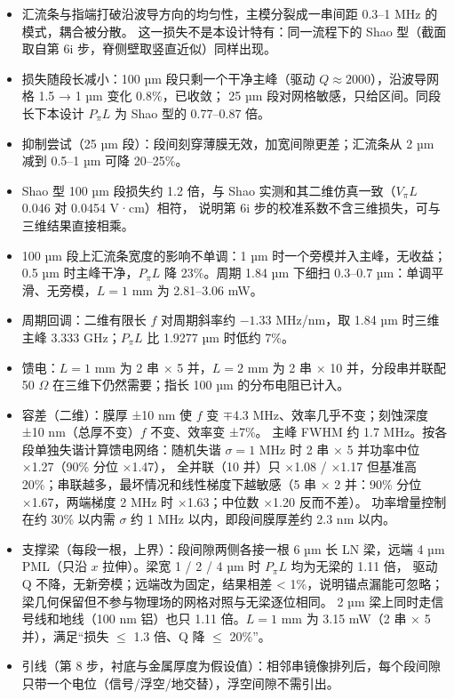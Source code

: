 \documentclass[10pt,a4paper]{article}
\begin{document}
\begin{itemize}
  \item 汇流条与指端打破沿波导方向的均匀性，主模分裂成一串间距 0.3--1 MHz 的模式，耦合被分散。
        这一损失不是本设计特有：同一流程下的 Shao 型（截面取自第 6i 步，脊侧壁取竖直近似）同样出现。
  \item 损失随段长减小：100 µm 段只剩一个干净主峰（驱动 $Q\approx2000$），沿波导网格 1.5 → 1 µm 变化 0.8\%，已收敛；
        25 µm 段对网格敏感，只给区间。同段长下本设计 $P_\pi L$ 为 Shao 型的 0.77--0.87 倍。
  \item 抑制尝试（25 µm 段）：段间刻穿薄膜无效，加宽间隙更差；汇流条从 2 µm 减到 0.5--1 µm 可降 20--25\%。
  \item Shao 型 100 µm 段损失约 1.2 倍，与 Shao 实测和其二维仿真一致（$V_\pi L$ 0.046 对 0.0454 V·cm）相符，
        说明第 6i 步的校准系数不含三维损失，可与三维结果直接相乘。
  \item 100 µm 段上汇流条宽度的影响不单调：1 µm 时一个旁模并入主峰，无收益；0.5 µm 时主峰干净，$P_\pi L$ 降 23\%。周期 1.84 µm 下细扫 0.3--0.7 µm：单调平滑、无旁模，$L = 1$ mm 为 2.81--3.06 mW。
  \item 周期回调：二维有限长 $f$ 对周期斜率约 $-1.33$ MHz/nm，取 1.84 µm 时三维主峰 3.333 GHz；$P_\pi L$ 比 1.9277 µm 时低约 7\%。
  \item 馈电：$L = 1$ mm 为 2 串 × 5 并，$L = 2$ mm 为 2 串 × 10 并，分段串并联配 50 $\Omega$ 在三维下仍然需要；指长 100 µm 的分布电阻已计入。
  \item 容差（二维）：膜厚 ±10 nm 使 $f$ 变 $\mp$4.3 MHz、效率几乎不变；刻蚀深度 ±10 nm（总厚不变）$f$ 不变、效率变 ±7\%。
        主峰 FWHM 约 1.7 MHz。按各段单独失谐计算馈电网络：随机失谐 $\sigma = 1$ MHz 时 2 串 × 5 并功率中位 ×1.27（90\% 分位 ×1.47），
        全并联（10 并）只 ×1.08 / ×1.17 但基准高 20\%；串联越多，最坏情况和线性梯度下越敏感（5 串 × 2 并：90\% 分位 ×1.67，两端梯度 2 MHz 时 ×1.63；中位数 ×1.20 反而不差）。
        功率增量控制在约 30\% 以内需 $\sigma$ 约 1 MHz 以内，即段间膜厚差约 2.3 nm 以内。
  \item 支撑梁（每段一根，上界）：段间隙两侧各接一根 6 µm 长 LN 梁，远端 4 µm PML（只沿 $x$ 拉伸）。梁宽 1 / 2 / 4 µm 时 $P_\pi L$ 均为无梁的 1.11 倍，
        驱动 Q 不降，无新旁模；远端改为固定，结果相差 < 1\%，说明锚点漏能可忽略；梁几何保留但不参与物理场的网格对照与无梁逐位相同。
        2 µm 梁上同时走信号线和地线（100 nm 铝）也只 1.11 倍。$L = 1$ mm 为 3.15 mW（2 串 × 5 并），满足“损失 $\le$ 1.3 倍、Q 降 $\le$ 20\%”。
  \item 引线（第 8 步，衬底与金属厚度为假设值）：相邻串镜像排列后，每个段间隙只带一个电位（信号/浮空/地交替），浮空间隙不需引出。

\end{itemize}
\end{document}
